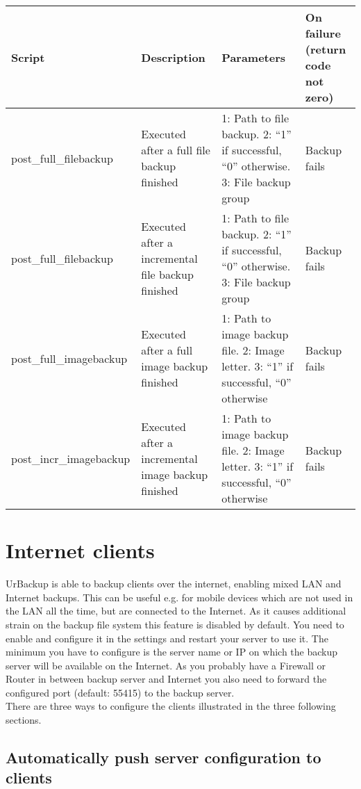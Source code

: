 \documentclass[a4paper,10pt]{article}
\begin{document}
\begin{tabular}{|p{}|p{}|p{}|p{}|}
\hline
Script & Description & Parameters & On failure (return code not zero)\\
\hline\hline
post\_full\_filebackup & Executed after a full file backup finished & 1: Path to file backup. 2: ``1'' if successful, ``0'' otherwise. 3: File backup group & Backup fails\\
\hline
post\_full\_filebackup & Executed after a incremental file backup finished & 1: Path to file backup. 2: ``1'' if successful, ``0'' otherwise. 3: File backup group & Backup fails\\
\hline
post\_full\_imagebackup & Executed after a full image backup finished & 1: Path to image backup file. 2: Image letter. 3: ``1'' if successful, ``0'' otherwise & Backup fails\\
\hline
post\_incr\_imagebackup & Executed after a incremental image backup finished & 1: Path to image backup file. 2: Image letter. 3: ``1'' if successful, ``0'' otherwise & Backup fails\\
\hline
\end{tabular} 

\section{Internet clients}
\label{sec:internet_clients}

UrBackup is able to backup clients over the internet, enabling mixed LAN and
Internet backups. This can be useful e.g. for mobile devices which are not
used in the LAN all the time, but are connected to the Internet. As it causes
additional strain on the backup file system this feature is disabled by default.
You need to enable and configure it in the settings and restart your server to
use it. The minimum you have to configure is the server name or IP on which
the backup server will be available on the Internet. As you probably have a
Firewall or Router in between backup server and Internet you also need to forward
the configured port (default: 55415) to the backup server.\\
There are three ways to configure the clients illustrated in the three following sections.

\subsection{Automatically push server configuration to clients}
\end{document}
